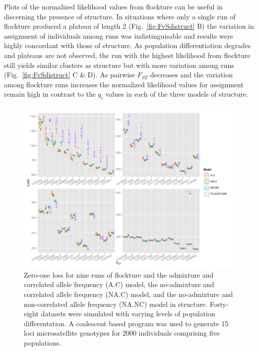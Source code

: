 Plots of the normalized likelihood values from {\sc flockture} can be useful in discerning the presence of 
structure.  In situations where only a single run of {\sc flockture} produced a plateau of length 2 
(Fig.~\ref{fig:FvSdistruct} B) the variation in assignment of individuals among runs was indistinguisable
and results were highly concordant with those of {\sc structure}. As population differentiation degrades 
and plateaus are not observed, the run with the highest likelihood from {\sc flockture} still yields
similar clusters as {\sc structure} but with more variation among runs (Fig.~\ref{fig:FvSdistruct} C \& D).
As pairwise $F_{ST}$ decreases and the variation among {\sc flockture} runs increases the normalized likelihood
values for assignment remain high in contrast to the $q_i$ values in each of the three models of {\sc structure}. 

  \begin{figure}
\centering
\includegraphics[width=.9\linewidth]{images/Figures-Pat/uSatloss.pdf}%
  \caption{Zero-one loss for nine runs of {\sc flockture} and the admixture and correlated allele 
  frequency (A.C) model, the no-admixture and correlated allele frequency (NA.C) model, 
and the no-admixture and non-correlated allele frequency (NA.NC) model in {\sc structure}. Forty-eight 
datasets were simulated with varying levels of population differentation. A coalescent based program
was used to generate 15 loci microsatellite genotypes for 2000 individuals comprising five populations.}
  \label{fig:uSatLoss}
\end{figure} 


